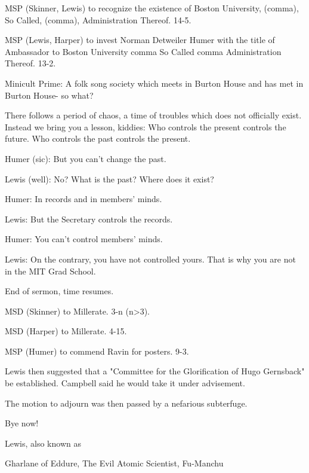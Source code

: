 \documentclass[12pt]{article}
\begin{document}
MSP (Skinner, Lewis) to recognize the existence of Boston University, (comma), So Called, (comma), Administration Thereof. 14-5.

MSP (Lewis, Harper) to invest Norman Detweiler Humer with the title of Ambassador to Boston University comma So Called comma Administration Thereof. 13-2.

Minicult Prime: A folk song society which meets in Burton House and has met in Burton House- so what?

There follows a period of chaos, a time of troubles which does not officially exist. Instead we bring you a lesson, kiddies: Who controls the present controls the future. Who controls the past controls the present.

Humer (sic): But you can't change the past.

Lewis (well): No? What is the past? Where does it exist?

Humer: In records and in members' minds.

Lewis: But the Secretary controls the records.

Humer: You can't control members' minds.

Lewis: On the contrary, you have not controlled yours. That is why you are not in the MIT Grad School.

End of sermon, time resumes.

MSD (Skinner) to Millerate. 3-n (n>3).

MSD (Harper) to Millerate. 4-15.

MSP (Humer) to commend Ravin for posters. 9-3.

Lewis then suggested that a "Committee for the Glorification of Hugo Gernsback" be established. Campbell said he would take it under advisement.

The motion to adjourn was then passed by a nefarious subterfuge.

Bye now!

\vspace{12pt}

\centerline{Lewis, also known as}
\centerline{Gharlane of Eddure, The Evil Atomic Scientist, Fu-Manchu}
\end{document}
